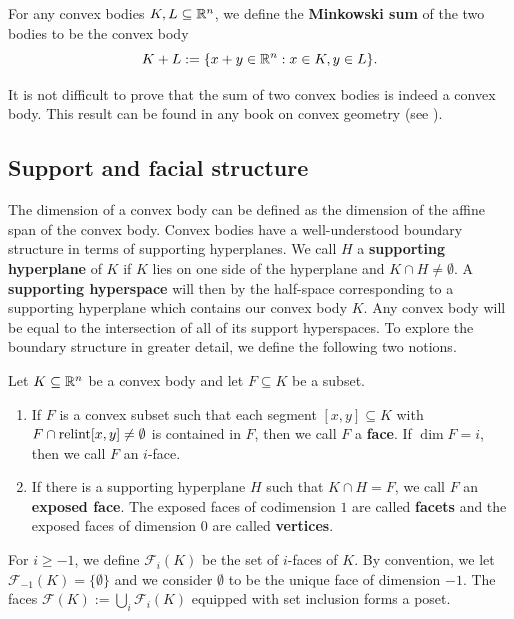 \documentclass{puthesis-UG}
\begin{document}
\begin{defn}
	For any convex bodies $K, L \subseteq \mathbb{R}^n$, we define the \textbf{Minkowski sum} of the two bodies to be the convex body
	\[
		K + L := \{x + y \in \mathbb{R}^n : x \in K, y \in L\}.
	\]
\end{defn}

It is not difficult to prove that the sum of two convex bodies is indeed a convex body. This result can be found in any book on convex geometry (see \cite{schneider_2013}). 

\subsection{Support and facial structure}

The dimension of a convex body can be defined as the dimension of the affine span of the convex body. Convex bodies have a well-understood boundary structure in terms of supporting hyperplanes. We call $H$ a \textbf{supporting hyperplane} of $K$ if $K$ lies on one side of the hyperplane and $K \cap H \neq \emptyset$. A \textbf{supporting hyperspace} will then by the half-space corresponding to a supporting hyperplane which contains our convex body $K$. Any convex body will be equal to the intersection of all of its support hyperspaces. To explore the boundary structure in greater detail, we define the following two notions. 
\begin{defn} \label{face-and-exposed-face}
	Let $K \subseteq \mathbb{R}^n$ be a convex body and let $F \subseteq K$ be a subset. 
	\begin{enumerate}[label = (\alph*)]
		\item If $F$ is a convex subset such that each segment $[x, y] \subseteq K$ with $F \cap \operatorname{relint} [x, y] \neq \emptyset$ is contained in $F$, then we call $F$ a \textbf{face}. If $\dim F = i$, then we call $F$ an $i$-face. 

		\item If there is a supporting hyperplane $H$ such that $K \cap H = F$, we call $F$ an \textbf{exposed face}. The exposed faces of codimension $1$ are called \textbf{facets} and the exposed faces of dimension $0$ are called \textbf{vertices}. 
	\end{enumerate}
	For $i \geq -1$, we define $\mathcal{F}_i(K)$ be the set of $i$-faces of $K$. By convention, we let $\mathcal{F}_{-1}(K) = \{\emptyset\}$ and we consider $\emptyset$ to be the unique face of dimension $-1$. The faces $\mathcal{F}(K) := \bigcup_i \mathcal{F}_i(K)$ equipped with set inclusion forms a poset. 
\end{defn}
\end{document}
